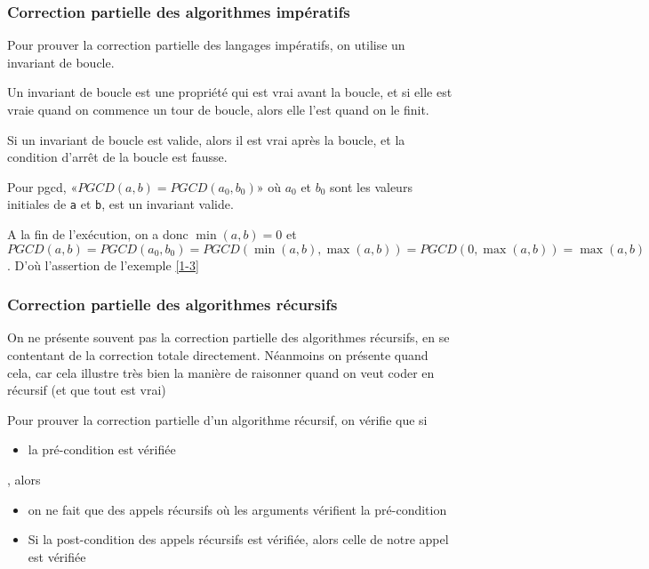 \subsubsection{Correction partielle des algorithmes impératifs}

Pour prouver la correction partielle des langages impératifs, on utilise un invariant de boucle.

\begin{definition}
	Un invariant de boucle est une propriété qui est vrai avant la boucle, et si elle est vraie quand on commence un tour de boucle, alors elle l'est quand on le finit.
\end{definition}

\begin{proposition}
	Si un invariant de boucle est valide, alors il est vrai après la boucle, et la condition d'arrêt de la boucle est fausse.
\end{proposition}

\begin{example}
	Pour pgcd, «$PGCD(a,b) = PGCD(a_0, b_0)$» où $a_0$ et $b_0$ sont les valeurs initiales de \texttt{a} et \texttt{b}, est un invariant valide.
	
	A la fin de l'exécution, on a donc $\min(a,b) = 0$ et $PGCD(a,b) = PGCD(a_0, b_0) = PGCD(\min(a,b), \max(a,b)) = PGCD(0, \max(a,b)) = \max(a,b)$. D'où l'assertion de l'exemple \ref{1-3}
\end{example}

\subsubsection{Correction partielle des algorithmes récursifs}

\begin{com}
	On ne présente souvent pas la correction partielle des algorithmes récursifs, en se contentant de la correction totale directement. Néanmoins on présente quand cela, car cela illustre très bien la manière de raisonner quand on veut coder en récursif (et que tout est vrai)
\end{com}

\begin{principe}
	Pour prouver la correction partielle d'un algorithme récursif, on vérifie que si \begin{itemize}[label=$\bullet$]
		\item la pré-condition est vérifiée
	\end{itemize}, alors
	\begin{itemize}[label=$\bullet$] 
		\item on ne fait que des appels récursifs où les arguments vérifient la pré-condition
		\item Si la post-condition des appels récursifs est vérifiée, alors celle de notre appel est vérifiée
	\end{itemize}
	\label{1-5}
\end{principe}

